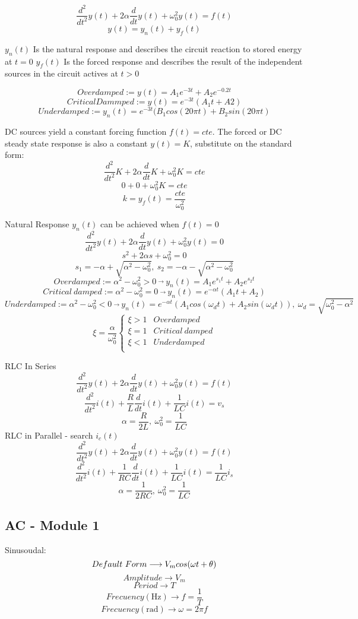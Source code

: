 \documentclass[]{article}
\begin{document}
$$\frac{d^{2}}{d t^2} y(t) +2\alpha\frac{d}{dt} y\left(t\right)+\omega_0^2y(t)=f(t)$$
$$y(t) = y_n(t)+y_f(t)$$

$y_n(t)$ Is the natural response and describes the circuit reaction to stored energy at $t=0$
$y_f(t)$ Is the forced response and describes the result of the independent sources in the circuit actives at $t>0$

$$Overdamped :=  y(t)=A_1e^{-3t}+A_2e^{-0.2t}$$
$$Critical Dammped :=  y(t)=e^{-3t}(A_1t+A2)$$
$$Underdamped:= y_n(t)=e^{-3t}(B_1cos(20\pi t)+B_2sin(20\pi t)$$

DC sources yield a constant forcing function $f(t)=cte$. The forced or DC steady state response is also a constant $y(t)=K$, substitute on the standard form:
$$\frac{d^{2}}{d t^2} K +2\alpha\frac{d}{dt} K+\omega_0^2K=cte$$
$$0+0+\omega_0^2K=cte$$
$$k=y_f(t)=\frac{cte}{\omega_0^2}$$

Natural Response
$y_n(t)$ can be achieved when $f(t)=0$
$$\frac{d^{2}}{d t^2} y(t) +2\alpha\frac{d}{dt} y\left(t\right)+\omega_0^2y(t)=0$$
$$s^2 +2\alpha s+\omega_0^2=0$$
$$s_1=- \alpha + \sqrt{\alpha^2-\omega_0^2}, \ s_2=- \alpha - \sqrt{\alpha^2-\omega_0^2}$$
$$Overdamped:=\alpha^2 -\omega_0^2>0\ \overrightarrow{} \ y_n(t)=A_1e^{s_1t}+A_2e^{s_2t}$$
$$Critical \ damped:=\alpha^2 -\omega_0^2=0\ \overrightarrow{} \ y_n(t)=e^{-\alpha t}(A_1t+A_2)$$
$$Underdamped:=\alpha^2 -\omega_0^2<0\ \overrightarrow{} \ y_n(t)=e^{-\alpha t}(A_1cos(\omega_dt)+A_2sin(\omega_dt)), \ \omega_d=\sqrt{\omega_0^2-\alpha^2}$$
\[ \xi=\frac{\alpha}{\omega_0^2}  \left\{
\begin{array}{ll}
\xi>1 & Overdamped \\
\xi=1 & Critical\ damped \\
\xi<1 & Underdamped \\
\end{array} 
\right. \]

RLC In Series
$$\frac{d^{2}}{d t^2} y(t) +2\alpha\frac{d}{dt} y\left(t\right)+\omega_0^2y(t)=f(t)$$
$$\frac{d^{2}}{d t^2} i(t) +\frac{R}{L}\frac{d}{dt} i\left(t\right)+\frac{1}{LC}i(t)=v_s$$
$$\alpha=\frac{R}{2L},\ \omega_0^2=\frac{1}{LC}$$
RLC in Parallel - search $i_c(t)$
$$\frac{d^{2}}{d t^2} y(t) +2\alpha\frac{d}{dt} y\left(t\right)+\omega_0^2y(t)=f(t)$$
$$\frac{d^{2}}{d t^2} i(t) +\frac{1}{RC}\frac{d}{dt} i\left(t\right)+\frac{1}{LC}i(t)=\frac{1}{LC}i_s$$
$$\alpha=\frac{1}{2RC},\ \omega_0^2=\frac{1}{LC}$$
\newpage
\subsection{AC - Module 1}
Sinusoudal:
$$
Default\ Form \longrightarrow V_m \\cos(\omega t + \theta) 
$$
$$
Amplitude \longrightarrow V_m 
$$
$$
Period \longrightarrow T 
$$
$$
Frecuency(\si{\hertz}) \longrightarrow f= \frac{1}{T} 
$$
$$
Frecuency(\si{\radian}) \longrightarrow \omega= 2\pi f 
$$
\end{document}
